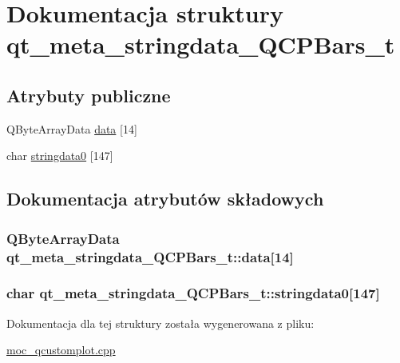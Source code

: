 \hypertarget{structqt__meta__stringdata___q_c_p_bars__t}{}\section{Dokumentacja struktury qt\+\_\+meta\+\_\+stringdata\+\_\+\+Q\+C\+P\+Bars\+\_\+t}
\label{structqt__meta__stringdata___q_c_p_bars__t}
\subsection*{Atrybuty publiczne}
\begin{DoxyCompactItemize}
\item 
Q\+Byte\+Array\+Data \hyperlink{structqt__meta__stringdata___q_c_p_bars__t_a40d7e47e2037dd5bb7c67e6397d92852}{data} \mbox{[}14\mbox{]}
\item 
char \hyperlink{structqt__meta__stringdata___q_c_p_bars__t_ab1c5ceea0b404e0edfc8690c1a945309}{stringdata0} \mbox{[}147\mbox{]}
\end{DoxyCompactItemize}


\subsection{Dokumentacja atrybutów składowych}
\subsubsection[{\texorpdfstring{data}{data}}]{\setlength{\rightskip}{0pt plus 5cm}Q\+Byte\+Array\+Data qt\+\_\+meta\+\_\+stringdata\+\_\+\+Q\+C\+P\+Bars\+\_\+t\+::data\mbox{[}14\mbox{]}}\hypertarget{structqt__meta__stringdata___q_c_p_bars__t_a40d7e47e2037dd5bb7c67e6397d92852}{}\label{structqt__meta__stringdata___q_c_p_bars__t_a40d7e47e2037dd5bb7c67e6397d92852}
\subsubsection[{\texorpdfstring{stringdata0}{stringdata0}}]{\setlength{\rightskip}{0pt plus 5cm}char qt\+\_\+meta\+\_\+stringdata\+\_\+\+Q\+C\+P\+Bars\+\_\+t\+::stringdata0\mbox{[}147\mbox{]}}\hypertarget{structqt__meta__stringdata___q_c_p_bars__t_ab1c5ceea0b404e0edfc8690c1a945309}{}\label{structqt__meta__stringdata___q_c_p_bars__t_ab1c5ceea0b404e0edfc8690c1a945309}


Dokumentacja dla tej struktury została wygenerowana z pliku\+:\begin{DoxyCompactItemize}
\item 
\hyperlink{moc__qcustomplot_8cpp}{moc\+\_\+qcustomplot.\+cpp}\end{DoxyCompactItemize}
